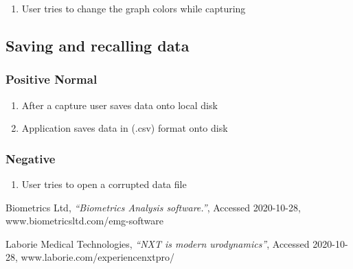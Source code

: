 \documentclass[12pt,a4paper]{article}
\begin{document}
\begin{enumerate}
	\item User tries to change the graph colors while capturing
\end{enumerate}

\subsection{Saving and recalling data}

\subsubsection{Positive Normal}

\begin{enumerate}
	\item After a capture user saves data onto local disk
	\item Application saves data in (.csv) format onto disk
\end{enumerate}

\subsubsection{Negative}

\begin{enumerate}
	\item User tries to open a corrupted data file  
\end{enumerate}

\begin{thebibliography}{9}

  Biometrics Ltd,
  \textit{“Biometrics Analysis software.”},
  Accessed 2020-10-28,
  www.biometricsltd.com/emg-software
  
  Laborie Medical Technologies,
  \textit{“NXT is modern urodynamics”},
  Accessed 2020-10-28,
  www.laborie.com/experiencenxtpro/

\end{thebibliography}
\end{document}
